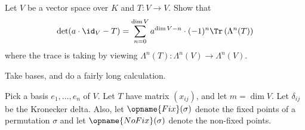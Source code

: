 \begin{problem}
	\yod
	Let $V$ be a vector space over $K$ and $T : V \to V$.
	Show that
	\[
		\det(a \cdot \id_V - T) =
		\sum_{n=0}^{\dim V} a^{\dim V-n} \cdot (-1)^n
		\Tr\left( \Lambda^n(T) \right)
	\]
	where the trace is taking by viewing $\Lambda^n(T) : \Lambda^n(V) \to \Lambda^n(V)$.
	\begin{hint}
		Take bases, and do a fairly long calculation.
	\end{hint}
	\begin{sol}
		\newcommand{\Fix}{\opname{Fix}}
		\newcommand{\NoFix}{\opname{NoFix}}
		Pick a basis $e_1, \dots, e_n$ of $V$.
		Let $T$ have matrix $(x_{ij})$, and let $m = \dim V$.
		Let $\delta_{ij}$ be the Kronecker delta.
		Also, let $\Fix(\sigma)$ denote the fixed points of a permutation $\sigma$
		and let $\NoFix(\sigma)$ denote the non-fixed points.


\end{sol}
\end{problem}
